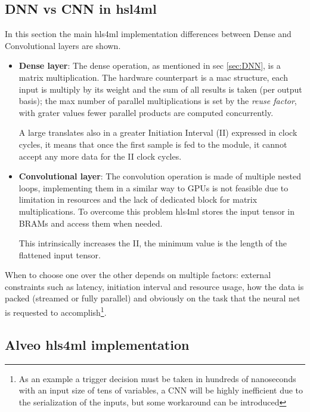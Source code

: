 \documentclass[../../main.tex]{subfiles}
\begin{document}
\subsection{DNN vs CNN in hsl4ml}
\label{sec:hls4ml_DNNvCNN}
In this section the main hls4ml implementation differences between Dense and Convolutional layers are shown.
\begin{itemize}
    \item \textbf{Dense layer}: The dense operation, as mentioned in sec \ref{sec:DNN}, is a matrix multiplication. The hardware counterpart is a \acrfull{mac} structure, each input is multiply by its weight and the sum of all results is taken (per output basis); the max number of parallel multiplications is set by the \textit{reuse factor}, with grater values fewer parallel products are computed concurrently\cite{hls4ml-DNN}.  
    
    A large  translates also in a greater Initiation Interval (II) expressed in clock cycles, it means that once the first sample is fed to the module, it cannot accept any more data for the II clock cycles.  
    
    \item \textbf{Convolutional layer}: The convolution operation is made of multiple nested loops, implementing them in a similar way to GPUs is not feasible due to limitation in resources and the lack of dedicated block for matrix multiplications. To overcome this problem hls4ml stores the input tensor in BRAMs and access them when needed\cite{hls4ml-CNN}.  
    
    This intrinsically increases the II, the minimum value is the length of the flattened input tensor.  
\end{itemize}

When to choose one over the other depends on multiple factors: external constraints such as latency, initiation interval  and resource usage, how the data is packed (streamed or fully parallel) and obviously on the task that the neural net is requested to accomplish\footnote{As an example a trigger decision must be taken in hundreds of nanoseconds with an input size of tens of variables, a CNN will be highly inefficient due to the serialization of the inputs, but some workaround can be introduced}.

\subsection{Alveo hls4ml implementation}
\label{sec:FPGA_alveo}
\end{document}
